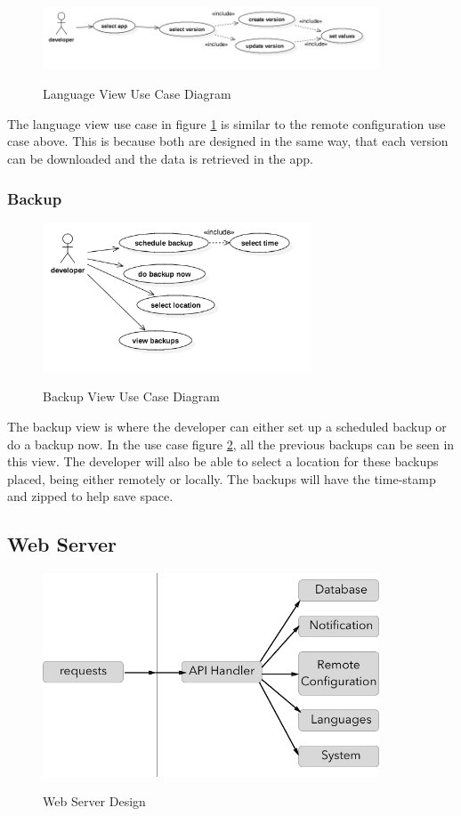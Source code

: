 \begin{figure}[!h]
    \caption{Language View Use Case Diagram}
    \centering
    \includegraphics[width=100mm]{images/use_cases/rc_uc}
    \label{fig:language_uc}
\end{figure}

The language view use case in figure \ref{fig:language_uc} is similar to the remote configuration use case above. This is because both are designed in the same way, that each version can be downloaded and the data is retrieved in the app.

\subsubsection{Backup} \label{d-db:backup}

\begin{figure}[!h]
    \caption{Backup View Use Case Diagram}
    \centering
    \includegraphics[width=80mm]{images/use_cases/backup_uc}
    \label{fig:backup_uc}
\end{figure}

The backup view is where the developer can either set up a scheduled backup or do a backup now. In the use case figure \ref{fig:backup_uc}, all the previous backups can be seen in this view. The developer will also be able to select a location for these backups placed, being either remotely or locally. The backups will have the time-stamp and zipped to help save space.

\subsection{Web Server} \label{d-web_server}

\begin{figure}[!h]
    \caption{Web Server Design}
    \centering
    \includegraphics[width=100mm]{images/design/api_handler}
    \label{fig:api_handler}
\end{figure}


